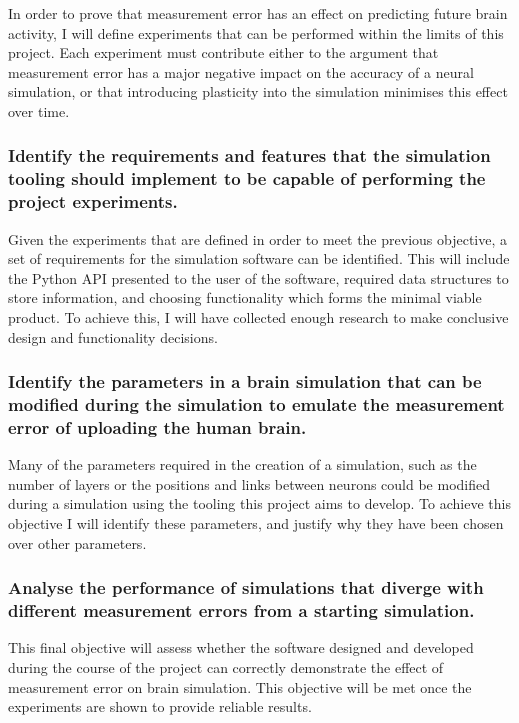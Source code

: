 In order to prove that measurement error has an effect on predicting future brain activity, I will
define experiments that can be performed within the limits of this project. Each
experiment must contribute either to the argument that measurement error has a
major negative impact on the accuracy of a neural simulation, or that
introducing plasticity into the simulation minimises this effect over time.


\subsubsection{Identify the requirements and features that the simulation
      tooling should implement to be capable of performing the project experiments.}

Given the experiments that are defined in order to meet the previous objective,
a set of requirements for the simulation software can be identified. This will
include the Python API presented to the user of the software, required data
structures to store information, and choosing functionality which forms the
minimal viable product. To achieve this, I will have collected enough research
to make conclusive design and functionality decisions.


\subsubsection{Identify
      the parameters in a brain simulation that can be modified during the simulation
      to emulate the measurement error of uploading the human brain.}

Many of the parameters required in the creation of a simulation, such as the
number of layers or the positions and links between neurons could be modified
during a simulation using the tooling this project aims to develop. To achieve
this objective I will identify these parameters, and justify why they have been
chosen over other parameters.


\subsubsection{Analyse the performance of simulations
      that diverge with different measurement errors from a starting simulation.}

This final objective will assess whether the software designed and developed
during the course of the project can correctly demonstrate the effect of
measurement error on brain simulation. This objective will be met once the
experiments are shown to provide reliable results.


